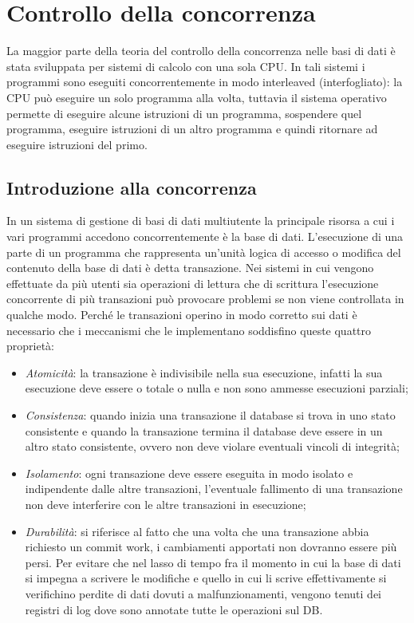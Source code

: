 \chapter{Controllo della concorrenza}
La maggior parte della teoria del controllo della concorrenza nelle basi di dati è stata sviluppata per sistemi di calcolo con una sola CPU. In tali sistemi i programmi sono eseguiti concorrentemente in modo interleaved (interfogliato): la CPU può eseguire un solo programma alla volta, tuttavia il sistema operativo permette di eseguire alcune istruzioni di un programma, sospendere quel programma, eseguire istruzioni di un altro programma e quindi ritornare ad eseguire istruzioni del primo.

\section{Introduzione alla concorrenza}
In un sistema di gestione di basi di dati multiutente la principale risorsa a cui i vari programmi accedono concorrentemente è la base di dati. L'esecuzione di una parte di un programma che rappresenta un'unità logica di accesso o modifica del contenuto della base di dati è detta transazione. Nei sistemi in cui vengono effettuate da più
utenti sia operazioni di lettura che di scrittura l'esecuzione concorrente di più transazioni può provocare problemi se non viene controllata in qualche modo. Perché le transazioni operino in modo corretto sui dati è necessario che i meccanismi che le implementano soddisfino queste quattro proprietà: 
\begin{itemize}
    \item \textit{Atomicità}: la transazione è indivisibile nella sua esecuzione, infatti la sua esecuzione deve essere o totale o nulla e non sono ammesse esecuzioni parziali;
    \item \textit{Consistenza}: quando inizia una transazione il database si trova in uno stato consistente e quando la transazione termina il database deve essere in un altro stato consistente, ovvero non deve violare eventuali vincoli di integrità;
    \item \textit{Isolamento}: ogni transazione deve essere eseguita in modo isolato e indipendente dalle altre transazioni, l'eventuale fallimento di una transazione non deve interferire con le altre transazioni in esecuzione;
    \item \textit{Durabilità}: si riferisce al fatto che una volta che una transazione abbia richiesto un commit work, i cambiamenti apportati non dovranno essere più persi. Per evitare che nel lasso di tempo fra il momento in cui la base di dati si impegna a scrivere le modifiche e quello in cui li scrive effettivamente si verifichino perdite di dati dovuti a malfunzionamenti, vengono tenuti dei registri di log dove sono annotate tutte le operazioni sul DB.
\end{itemize}

